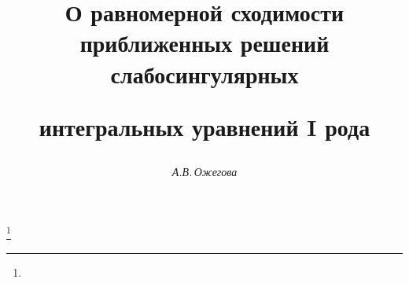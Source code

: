 









\newcommand{\lea}{\leqslant}


\newcommand{\ve}{\varepsilon}


\newcommand{\N}{\Bbb{N}}


\newcommand{\R}{\Bbb{R}}


\newcommand{\ol}{\overline}


\newcommand{\tts}[1]{}










\setcounter{page}{67}















\author{\it А.В.\,Ожегова}




\title{О равномерной сходимости приближенных решений слабосингулярных


интегральных уравнений I рода}


\thanks{}





\date{}




\pagestyle{plain} %







